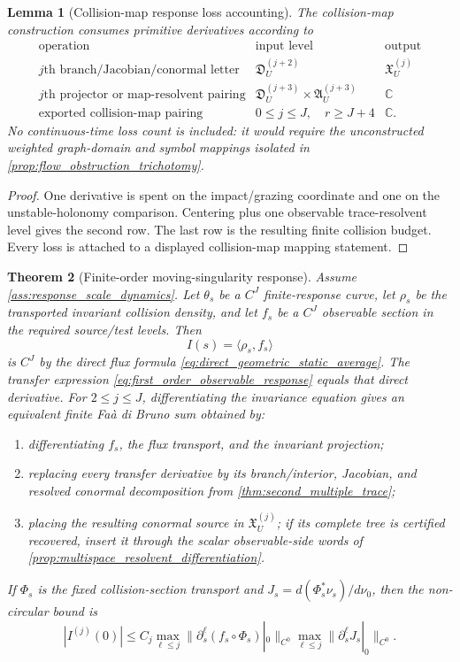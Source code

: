 \documentclass[11pt]{amsart}
\theoremstyle{compactplain}
\newtheorem{theorem}{Theorem}[section]
\newtheorem{lemma}[theorem]{Lemma}
\theoremstyle{compactdefinition}
\theoremstyle{compactremark}
\begin{document}
\begin{lemma}[Collision-map response loss accounting]
\label{lem:response_loss_accounting}
The collision-map construction consumes primitive derivatives according to
\[
\begin{array}{c|c|c}
\text{operation} & \text{input level} & \text{output}\\
\hline
j\text{th branch/Jacobian/conormal letter}
&\mathfrak D_U^{(j+2)}
&\mathfrak X_U^{(j)}\\
j\text{th projector or map-resolvent pairing}
&\mathfrak D_U^{(j+3)}\times\mathfrak A_U^{(j+3)}
&\mathbb C\\
\text{exported collision-map pairing}
&0\le j\le J,\quad r\ge J+4
&\mathbb C .
\end{array}
\]
No continuous-time loss count is included: it would require the unconstructed
weighted graph-domain and symbol mappings isolated in
\cref{prop:flow_obstruction_trichotomy}.
\end{lemma}

\begin{proof}
One derivative is spent on the impact/grazing coordinate and one on the
unstable-holonomy comparison.  Centering plus one observable trace-resolvent
level gives the second row.  The last row is the resulting finite collision
budget.  Every loss is attached to a displayed collision-map mapping
statement.
\end{proof}

\begin{theorem}[Finite-order moving-singularity response]
\label{thm:finite_order_moving_singularity_response}
Assume \cref{ass:response_scale_dynamics}.  Let \(\theta_s\) be a \(C^J\)
finite-response curve, let \(\rho_s\) be the
transported invariant collision density, and let \(f_s\) be a \(C^J\)
observable section in the required source/test levels.  Then
\[
  I(s)=\langle\rho_s,f_s\rangle
\]
is \(C^J\) by the direct flux formula
\eqref{eq:direct_geometric_static_average}.  The transfer expression
\eqref{eq:first_order_observable_response} equals that direct derivative.  For
\(2\le j\le J\), differentiating the invariance equation gives an equivalent
finite Faà di Bruno sum obtained by:
\begin{enumerate}[label=\textup{(\roman*)},wide,labelindent=0pt]
  \item differentiating \(f_s\), the flux transport, and the invariant
  projection;
  \item replacing every transfer derivative by its branch/interior,
  Jacobian, and resolved conormal decomposition from
  \cref{thm:second_multiple_trace};
  \item placing the resulting conormal source in
  \(\mathfrak X_U^{(j)}\); if its complete tree is certified recovered, insert
  it through the scalar observable-side words of
  \cref{prop:multispace_resolvent_differentiation}.
\end{enumerate}
If \(\Phi_s\) is the fixed collision-section transport and
\(J_s=d(\Phi_s^*\nu_s)/d\nu_0\), then the non-circular bound is
\[
  |I^{(j)}(0)|
  \le C_j
  \max_{\ell\le j}\|\partial_s^\ell(f_s\circ\Phi_s)|_0\|_{C^0}
  \max_{\ell\le j}\|\partial_s^\ell J_s|_0\|_{C^0}.
\]
\end{theorem}
\end{document}
